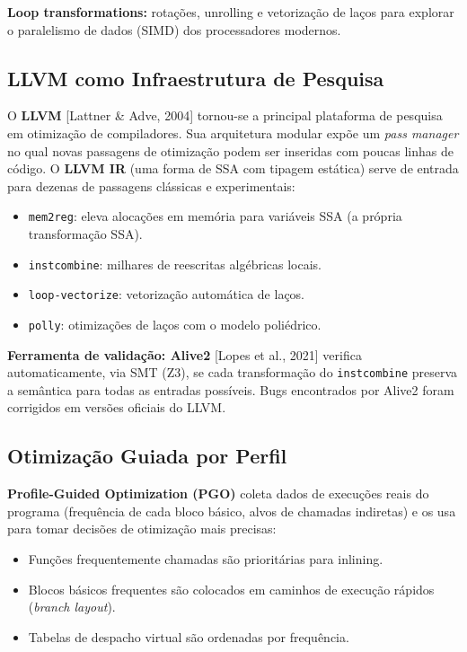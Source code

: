 \textbf{Loop transformations:} rotações, unrolling e vetorização de
laços para explorar o paralelismo de dados (SIMD) dos processadores
modernos.

\subsection{LLVM como Infraestrutura de Pesquisa}

O \textbf{LLVM} [Lattner \& Adve, 2004] tornou-se a principal
plataforma de pesquisa em otimização de compiladores. Sua arquitetura
modular expõe um \emph{pass manager} no qual novas passagens de
otimização podem ser inseridas com poucas linhas de código. O
\textbf{LLVM IR} (uma forma de SSA com tipagem estática) serve de
entrada para dezenas de passagens clássicas e experimentais:

\begin{itemize}
  \item \texttt{mem2reg}: eleva alocações em memória para variáveis
    SSA (a própria transformação SSA).
  \item \texttt{instcombine}: milhares de reescritas algébricas locais.
  \item \texttt{loop-vectorize}: vetorização automática de laços.
  \item \texttt{polly}: otimizações de laços com o modelo poliédrico.
\end{itemize}

\textbf{Ferramenta de validação: Alive2} [Lopes et al., 2021] verifica
automaticamente, via SMT (Z3), se cada transformação do
\texttt{instcombine} preserva a semântica para todas as entradas
possíveis. Bugs encontrados por Alive2 foram corrigidos em versões
oficiais do LLVM.

\subsection{Otimização Guiada por Perfil}

\textbf{Profile-Guided Optimization (PGO)} coleta dados de execuções
reais do programa (frequência de cada bloco básico, alvos de chamadas
indiretas) e os usa para tomar decisões de otimização mais precisas:

\begin{itemize}
  \item Funções frequentemente chamadas são prioritárias para inlining.
  \item Blocos básicos frequentes são colocados em caminhos de execução
    rápidos (\emph{branch layout}).
  \item Tabelas de despacho virtual são ordenadas por frequência.
\end{itemize}

